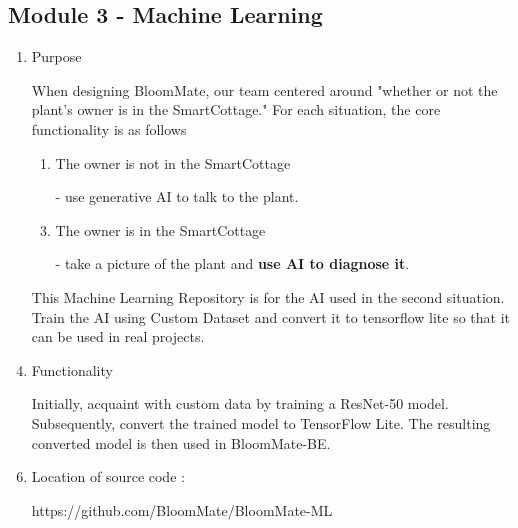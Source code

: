 \documentclass[conference, a4paper]{IEEEtran}
\begin{document}
\subsection{Module 3 - Machine Learning}
\begin{enumerate}
    \item Purpose
    \item[] When designing BloomMate, our team centered around "whether or not the plant's owner is in the SmartCottage." For each situation, the core functionality is as follows
    \begin{enumerate}
        \item The owner is not in the SmartCottage
        \item[ -] use generative AI to talk to the plant.
        \item The owner is in the SmartCottage
        \item[ -] take a picture of the plant and \textbf{use AI to diagnose it}.
    \end{enumerate}
    \item[] This Machine Learning Repository is for the AI used in the second situation. Train the AI using Custom Dataset and convert it to tensorflow lite so that it can be used in real projects.

    \item Functionality
    \item[] Initially, acquaint with custom data by training a ResNet-50 model. Subsequently, convert the trained model to TensorFlow Lite. The resulting converted model is then used in BloomMate-BE.

    \item Location of source code :
    \item[] https://github.com/BloomMate/BloomMate-ML


\end{enumerate}
\end{document}
